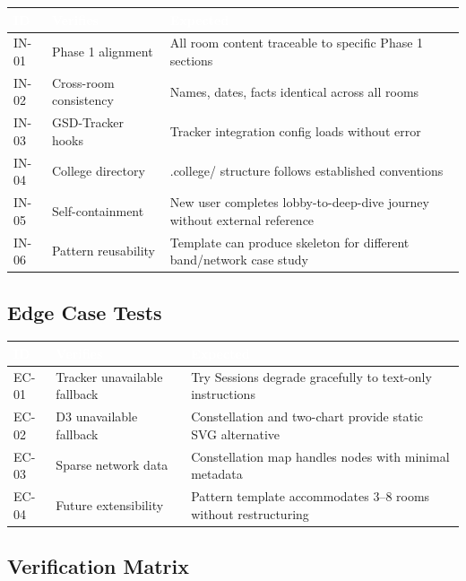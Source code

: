 \documentclass[11pt,letterpaper]{article}
\newcommand{\tableheader}[1]{\textbf{\sffamily\textcolor{white}{#1}}}
\begin{document}
\begin{center}
\begin{tabularx}{\textwidth}{C{1.2cm}L{3.5cm}X}
\toprule
{}
\tableheader{ID} & \tableheader{Verifies} & \tableheader{Expected} \\
\midrule
IN-01 & Phase 1 alignment & All room content traceable to specific Phase 1 sections \\
IN-02 & Cross-room consistency & Names, dates, facts identical across all rooms \\
IN-03 & GSD-Tracker hooks & Tracker integration config loads without error \\
IN-04 & College directory & .college/ structure follows established conventions \\
IN-05 & Self-containment & New user completes lobby-to-deep-dive journey without external reference \\
IN-06 & Pattern reusability & Template can produce skeleton for different band/network case study \\
\bottomrule
\end{tabularx}
\end{center}

\subsection{Edge Case Tests}

\begin{center}
\begin{tabularx}{\textwidth}{C{1.2cm}L{3.5cm}X}
\toprule
{}
\tableheader{ID} & \tableheader{Verifies} & \tableheader{Expected} \\
\midrule
EC-01 & Tracker unavailable fallback & Try Sessions degrade gracefully to text-only instructions \\
EC-02 & D3 unavailable fallback & Constellation and two-chart provide static SVG alternative \\
EC-03 & Sparse network data & Constellation map handles nodes with minimal metadata \\
EC-04 & Future extensibility & Pattern template accommodates 3--8 rooms without restructuring \\
\bottomrule
\end{tabularx}
\end{center}

\subsection{Verification Matrix}
\end{document}
